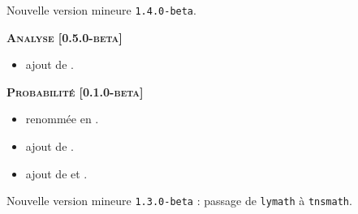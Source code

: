 \documentclass[12pt,a4paper]{book}
\begin{document}
\begin{description}
\begin{itemize}[itemsep=.5em]
    
\end{itemize}


\separation

\end{description}\begin{description}
\medskip
\item[2020-07-22] Nouvelle version mineure \verb+1.4.0-beta+.




\begin{center}
    \textbf{\textsc{Analyse [0.5.0-beta]}}
\end{center}

\begin{itemize}[itemsep=.5em]
    \item {}
          ajout de .

    
\end{itemize}


\separation




\begin{center}
    \textbf{\textsc{Probabilité [0.1.0-beta]}}
\end{center}

\begin{itemize}[itemsep=.5em]
    \item {}
           renommée en  .


    

    \item {}
          ajout de .


    

    \item {}
          ajout de  et .


    

\end{itemize}


\separation

\end{description}\begin{description}
\medskip
\item[2020-07-21] Nouvelle version mineure \verb+1.3.0-beta+ : passage de \verb#lymath# à \verb#tnsmath#.



\end{description}
\end{document}
